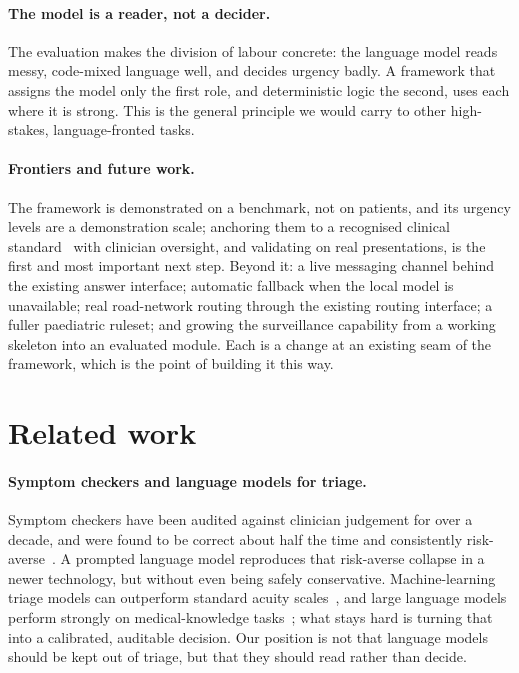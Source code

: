 \documentclass[11pt]{article}
\begin{document}
\paragraph{The model is a reader, not a decider.} The evaluation makes the division of labour concrete: the
language model reads messy, code-mixed language well, and decides urgency badly. A framework that assigns the
model only the first role, and deterministic logic the second, uses each where it is strong. This is the
general principle we would carry to other high-stakes, language-fronted tasks.

\paragraph{Frontiers and future work.} The framework is demonstrated on a benchmark, not on patients, and its
urgency levels are a demonstration scale; anchoring them to a recognised clinical standard~\cite{esi} with clinician
oversight, and validating on real presentations, is the first and most important next step. Beyond it: a live
messaging channel behind the existing answer interface; automatic fallback when the local model is
unavailable; real road-network routing through the existing routing interface; a fuller paediatric ruleset;
and growing the surveillance capability from a working skeleton into an evaluated module. Each is a change at an
existing seam of the framework, which is the point of building it this way.

\section{Related work}
\label{sec:related}
\paragraph{Symptom checkers and language models for triage.} Symptom checkers have been audited against
clinician judgement for over a decade, and were found to be correct about half the time and consistently
risk-averse~\cite{semigran}. A prompted language model reproduces that risk-averse collapse in a newer
technology, but without even being safely conservative. Machine-learning triage models can outperform standard
acuity scales~\cite{levin}, and large language models perform strongly on medical-knowledge tasks~\cite{singhal,thirun};
what stays hard is turning that into a calibrated, auditable decision. Our position is not that language models
should be kept out of triage, but that they should read rather than decide.
\end{document}

